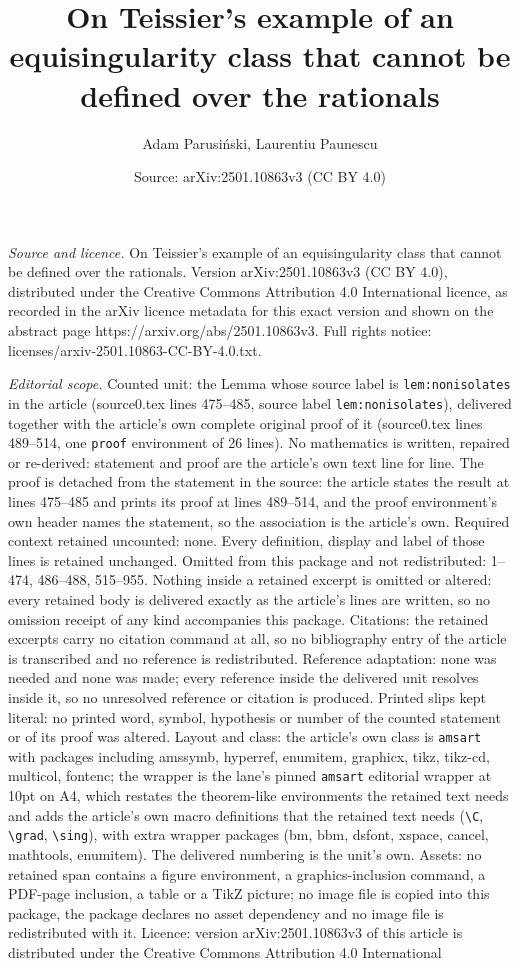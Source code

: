 \documentclass[10pt,a4paper]{amsart}
\title[On Teissier's example of an equisingularity class that canno]{On Teissier's example of an equisingularity class that cannot be defined over the rationals}
\author{Adam Parusi\'nski, Laurentiu Paunescu}
\date{Source: arXiv:2501.10863v3 (CC BY 4.0)}
\begin{document}
\maketitle

\noindent\emph{Source and licence.} On Teissier's example of an equisingularity class that cannot be defined over the rationals. Version arXiv:2501.10863v3 (CC BY 4.0), distributed under the Creative Commons Attribution 4.0 International licence, as recorded in the arXiv licence metadata for this exact version and shown on the abstract page https://arxiv.org/abs/2501.10863v3. Full rights notice: licenses/arxiv-2501.10863-CC-BY-4.0.txt.\par\smallskip

\noindent\textit{Editorial scope.} Counted unit: the Lemma whose source label is \texttt{lem:nonisolates} in the article (source0.tex lines 475--485, source label \texttt{lem:nonisolates}), delivered together with the article's own complete original proof of it (source0.tex lines 489--514, one \texttt{proof} environment of 26 lines). No mathematics is written, repaired or re-derived: statement and proof are the article's own text line for line. The proof is detached from the statement in the source: the article states the result at lines 475--485 and prints its proof at lines 489--514, and the proof environment's own header names the statement, so the association is the article's own. Required context retained uncounted: none. Every definition, display and label of those lines is retained unchanged. Omitted from this package and not redistributed: 1--474, 486--488, 515--955. Nothing inside a retained excerpt is omitted or altered: every retained body is delivered exactly as the article's lines are written, so no omission receipt of any kind accompanies this package. Citations: the retained excerpts carry no citation command at all, so no bibliography entry of the article is transcribed and no reference is redistributed. Reference adaptation: none was needed and none was made; every reference inside the delivered unit resolves inside it, so no unresolved reference or citation is produced. Printed slips kept literal: no printed word, symbol, hypothesis or number of the counted statement or of its proof was altered. Layout and class: the article's own class is \texttt{amsart} with packages including amssymb, hyperref, enumitem, graphicx, tikz, tikz-cd, multicol, fontenc; the wrapper is the lane's pinned \texttt{amsart} editorial wrapper at 10pt on A4, which restates the theorem-like environments the retained text needs and adds the article's own macro definitions that the retained text needs (\texttt{\textbackslash C}, \texttt{\textbackslash grad}, \texttt{\textbackslash sing}), with extra wrapper packages (bm, bbm, dsfont, xspace, cancel, mathtools, enumitem). The delivered numbering is the unit's own. Assets: no retained span contains a figure environment, a graphics-inclusion command, a PDF-page inclusion, a table or a TikZ picture; no image file is copied into this package, the package declares no asset dependency and no image file is redistributed with it. Licence: version arXiv:2501.10863v3 of this article is distributed under the Creative Commons Attribution 4.0 International 
\end{document}
